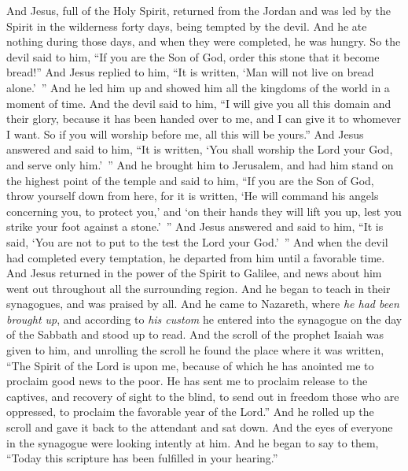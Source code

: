 \begin{biblechapter} %
 And Jesus, full of the Holy Spirit, returned from the Jordan and was led by the Spirit in the wilderness
\verse forty days, being tempted by the devil. And he ate nothing during those days, and when they were completed, he was hungry.
\verse So the devil said to him, “If you are the Son of God, order this stone that it become bread!”
\verse And Jesus replied to him, “It is written, ‘Man will not live on bread alone.’ ”
\verse And he led him up and showed him all the kingdoms of the world in a moment of time.
\verse And the devil said to him, “I will give you all this domain and their glory, because it has been handed over to me, and I can give it to whomever I want.
\verse So if you will worship before me, all this will be yours.”
\verse And Jesus answered and said to him, “It is written, ‘You shall worship the Lord your God, and serve only him.’ ”
\verse And he brought him to Jerusalem, and had him stand on the highest point of the temple and said to him, “If you are the Son of God, throw yourself down from here,
\verse for it is written, ‘He will command his angels concerning you, 
to protect you,’
\verse and ‘on their hands they will lift you up, 
lest you strike your foot against a stone.’ ”
\verse And Jesus answered and said to him, “It is said, ‘You are not to put to the test the Lord your God.’ ”
\verse And when the devil had completed every temptation, he departed from him until a favorable time.
 And Jesus returned in the power of the Spirit to Galilee, and news about him went out throughout all the surrounding region.
\verse And he began to teach in their synagogues, and was praised by all.
 And he came to Nazareth, where \textit{he had been brought up}, and according to \textit{his custom} he entered into the synagogue on the day of the Sabbath and stood up to read.
\verse And the scroll of the prophet Isaiah was given to him, and unrolling the scroll he found the place where it was written,
\verse “The Spirit of the Lord is upon me, 
because of which he has anointed me 
to proclaim good news to the poor. 
He has sent me 
to proclaim release to the captives, 
and recovery of sight to the blind, 
to send out in freedom those who are oppressed,
\verse to proclaim the favorable year of the Lord.”
\verse And he rolled up the scroll and gave it back to the attendant and sat down. And the eyes of everyone in the synagogue were looking intently at him.
\verse And he began to say to them, “Today this scripture has been fulfilled in your hearing.”

\end{biblechapter}
